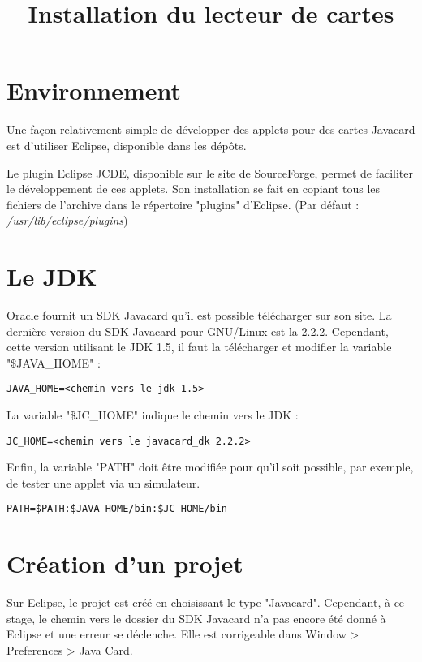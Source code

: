 \documentclass[a4paper,11pt,french]{article}
\title{Installation du lecteur de cartes}
\begin{document}
\maketitle

\section{Environnement}
Une façon relativement simple de développer des applets pour des cartes
Javacard est d'utiliser Eclipse, disponible dans les dépôts. 

Le plugin Eclipse JCDE, disponible sur le site de SourceForge, permet de 
faciliter le développement de ces applets. Son installation se fait en copiant
tous les fichiers de l'archive dans le répertoire "plugins" d'Eclipse. (Par
défaut : \emph{/usr/lib/eclipse/plugins})


\section{Le JDK}
Oracle fournit un SDK Javacard qu'il est possible télécharger sur son site.
La dernière version du SDK Javacard pour GNU/Linux est la 2.2.2. Cependant,
cette version utilisant le JDK 1.5, il faut la télécharger et modifier la 
variable "\$JAVA\_HOME" :
\begin{verbatim}
JAVA_HOME=<chemin vers le jdk 1.5>

\end{verbatim}

La variable "\$JC\_HOME" indique le chemin vers le JDK :
\begin{verbatim}
JC_HOME=<chemin vers le javacard_dk 2.2.2>

\end{verbatim}

Enfin, la variable "PATH" doit être modifiée pour qu'il soit possible, par
exemple, de tester une applet via un simulateur.
\begin{verbatim}
PATH=$PATH:$JAVA_HOME/bin:$JC_HOME/bin

\end{verbatim}

\section{Création d'un projet}
Sur Eclipse, le projet est créé en choisissant le type "Javacard". Cependant,
à ce stage, le chemin vers le dossier du SDK Javacard n'a pas encore été donné
à Eclipse et une erreur se déclenche. Elle est corrigeable dans Window > 
Preferences > Java Card.
\end{document}
